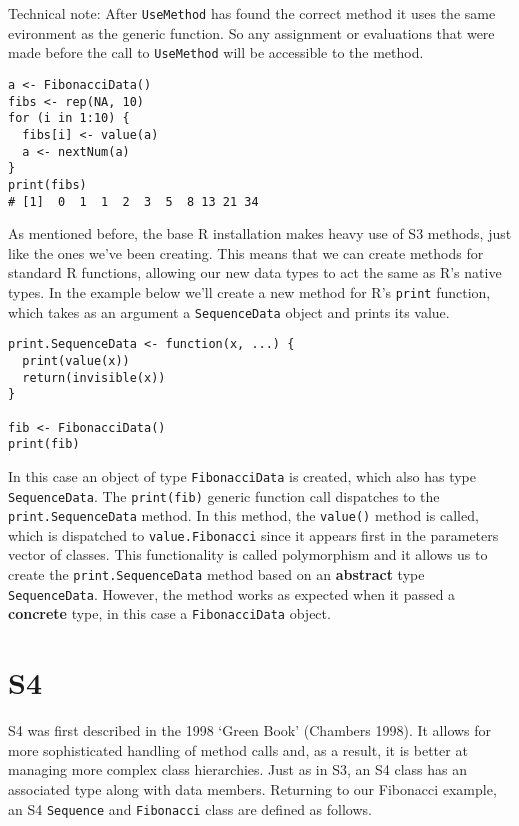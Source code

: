 Technical note: After \texttt{UseMethod} has found the correct method it
uses the same evironment as the generic function. So any assignment or
evaluations that were made before the call to \texttt{UseMethod} will be
accessible to the method.

\begin{verbatim}
a <- FibonacciData()
fibs <- rep(NA, 10)
for (i in 1:10) {
  fibs[i] <- value(a)
  a <- nextNum(a)
}
print(fibs)
# [1]  0  1  1  2  3  5  8 13 21 34
\end{verbatim}

As mentioned before, the base R installation makes heavy use of S3
methods, just like the ones we've been creating. This means that we can
create methods for standard R functions, allowing our new data types to
act the same as R's native types. In the example below we'll create a
new method for R's \texttt{print} function, which takes as an argument a
\texttt{SequenceData} object and prints its value.

\begin{verbatim}
print.SequenceData <- function(x, ...) {
  print(value(x))
  return(invisible(x))
}

fib <- FibonacciData()
print(fib)
\end{verbatim}

In this case an object of type \texttt{FibonacciData} is created, which
also has type \texttt{SequenceData}. The \texttt{print(fib)} generic
function call dispatches to the \texttt{print.SequenceData} method. In
this method, the \texttt{value()} method is called, which is dispatched
to \texttt{value.Fibonacci} since it appears first in the parameters
vector of classes. This functionality is called polymorphism and it
allows us to create the \texttt{print.SequenceData} method based on an
\textbf{abstract} type \texttt{SequenceData}. However, the method works
as expected when it passed a \textbf{concrete} type, in this case a
\texttt{FibonacciData} object.

\section{S4}\label{s4-ss}

S4 was first described in the 1998 `Green Book' (Chambers 1998). It
allows for more sophisticated handling of method calls and, as a result,
it is better at managing more complex class hierarchies. Just as in S3,
an S4 class has an associated type along with data members. Returning to
our Fibonacci example, an S4 \texttt{Sequence} and \texttt{Fibonacci}
class are defined as follows.

